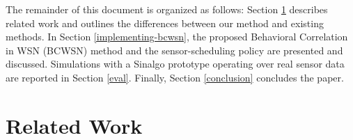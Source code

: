 \documentclass{acm_proc_article-sp}
\begin{document}
The remainder of this document is organized as follows: Section
\ref{related-work} describes related work and outlines the differences between
our method and existing methods. In Section \ref{implementing-bcwsn}, the
proposed Behavioral Correlation in WSN (BCWSN) method and the sensor-scheduling
policy are presented and discussed. Simulations with a Sinalgo prototype
operating over real sensor data are reported in Section \ref{eval}. Finally,
Section \ref{conclusion} concludes the paper.


\section{Related Work}
\label{related-work}


\end{document}
